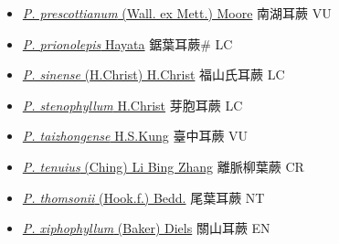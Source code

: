 \begin{itemize}
\begin{itemize}
        \item[] \href{http://www.theplantlist.org/tpl1.1/search?q=Polystichum+prescottianum}{\textit{P. prescottianum} (Wall. ex Mett.) Moore}   南湖耳蕨 VU
        \item[] \href{http://www.theplantlist.org/tpl1.1/search?q=Polystichum+prionolepis}{\textit{P. prionolepis} Hayata}   鋸葉耳蕨\# LC
        \item[] \href{http://www.theplantlist.org/tpl1.1/search?q=Polystichum+sinense}{\textit{P. sinense} (H.Christ) H.Christ}     福山氏耳蕨 LC
        \item[] \href{http://www.theplantlist.org/tpl1.1/search?q=Polystichum+stenophyllum}{\textit{P. stenophyllum} H.Christ}   芽胞耳蕨 LC
        \item[] \href{http://www.theplantlist.org/tpl1.1/search?q=Polystichum+taizhongense}{\textit{P. taizhongense} H.S.Kung}   臺中耳蕨 VU
        \item[] \href{http://www.theplantlist.org/tpl1.1/search?q=Polystichum+tenuius}{\textit{P. tenuius} (Ching) Li Bing Zhang}   離脈柳葉蕨 CR
        \item[] \href{http://www.theplantlist.org/tpl1.1/search?q=Polystichum+thomsonii}{\textit{P. thomsonii} (Hook.f.) Bedd.}   尾葉耳蕨 NT
        \item[] \href{http://www.theplantlist.org/tpl1.1/search?q=Polystichum+xiphophyllum}{\textit{P. xiphophyllum} (Baker) Diels}   關山耳蕨 EN
  \end{itemize}
  \end{itemize}
